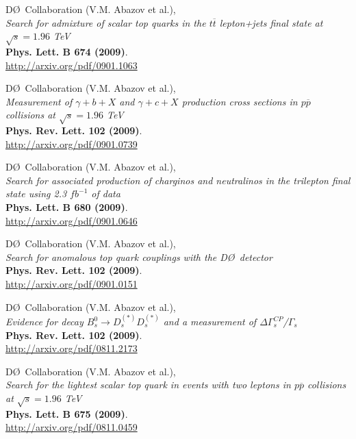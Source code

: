 \documentclass[12pt]{article}
\begin{document}
%
D\O~Collaboration (V.M. Abazov et al.), \\
\textsl{Search for admixture of scalar top quarks in the $t\overline{t}$ lepton+jets final state at $\sqrt{s}=1.96$ TeV}\\
\textbf{Phys. Lett. B 674 (2009)}.\\
{\small{\url{http://arxiv.org/pdf/0901.1063}}}\vspace{4mm}

%
D\O~Collaboration (V.M. Abazov et al.), \\
\textsl{ Measurement of $\gamma + b + X$ and $\gamma + c + X$ production cross sections in $p\overline{p}$ collisions at $\sqrt{s}=1.96$ TeV}\\
\textbf{Phys. Rev. Lett. 102 (2009)}.\\
{\small{\url{http://arxiv.org/pdf/0901.0739}}}\vspace{4mm}

%
D\O~Collaboration (V.M. Abazov et al.), \\
\textsl{Search for associated production of charginos and neutralinos in the trilepton final state using 2.3 $fb^{-1}$ of data}\\
\textbf{Phys. Lett. B 680 (2009)}.\\
{\small{\url{http://arxiv.org/pdf/0901.0646}}}\vspace{4mm}

%
D\O~Collaboration (V.M. Abazov et al.), \\
\textsl{Search for anomalous top quark couplings with the D\O~detector}\\
\textbf{Phys. Rev. Lett. 102 (2009)}.\\
{\small{\url{http://arxiv.org/pdf/0901.0151}}}\vspace{4mm}

%
D\O~Collaboration (V.M. Abazov et al.), \\
\textsl{ Evidence for decay $B^0_s\rightarrow D^{(*)}_s D^{(*)}_s$ and a measurement of $\Delta\Gamma^{CP}_s$/$\Gamma_s$}\\
\textbf{Phys. Rev. Lett. 102 (2009)}.\\
{\small{\url{http://arxiv.org/pdf/0811.2173}}}\vspace{4mm}

%
D\O~Collaboration (V.M. Abazov et al.), \\
\textsl{Search for the lightest scalar top quark in events with two leptons in $p\overline{p}$ collisions at $\sqrt{s}=1.96$ TeV}\\
\textbf{Phys. Lett. B 675 (2009)}.\\
{\small{\url{http://arxiv.org/pdf/0811.0459}}}\vspace{4mm}
\end{document}
